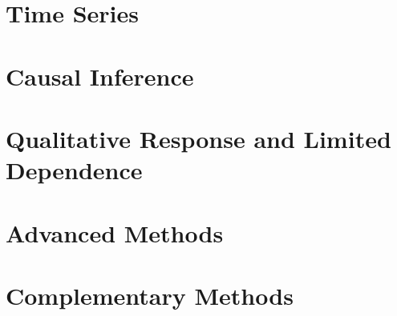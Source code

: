 \documentclass[12pt, a4paper, twoside, openright]{book}
\begin{document}










\part{Time Series}







\part{Causal Inference}




\part{Qualitative Response and Limited Dependence}






\part{Advanced Methods}











\part{Complementary Methods}









\end{document}
